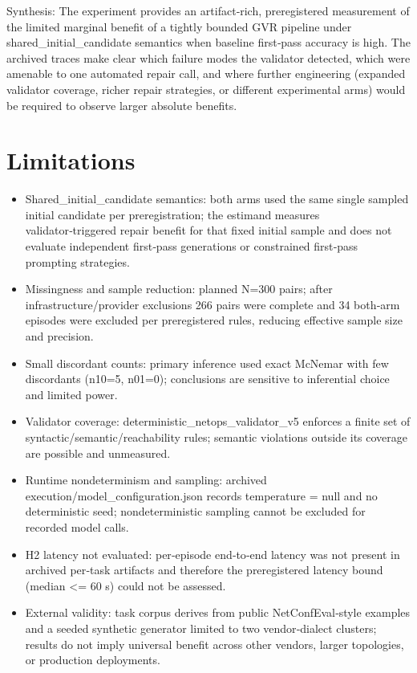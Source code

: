 \documentclass[conference]{IEEEtran}
\begin{document}
Synthesis: The experiment provides an artifact‑rich, preregistered measurement of the limited marginal benefit of a tightly bounded GVR pipeline under shared\_initial\_candidate semantics when baseline first‑pass accuracy is high. The archived traces make clear which failure modes the validator detected, which were amenable to one automated repair call, and where further engineering (expanded validator coverage, richer repair strategies, or different experimental arms) would be required to observe larger absolute benefits.

\section{Limitations}
\begin{itemize}
\item Shared\_initial\_candidate semantics: both arms used the same single sampled initial candidate per preregistration; the estimand measures validator‑triggered repair benefit for that fixed initial sample and does not evaluate independent first‑pass generations or constrained first‑pass prompting strategies.
\item Missingness and sample reduction: planned N=300 pairs; after infrastructure/provider exclusions 266 pairs were complete and 34 both‑arm episodes were excluded per preregistered rules, reducing effective sample size and precision.
\item Small discordant counts: primary inference used exact McNemar with few discordants (n10=5, n01=0); conclusions are sensitive to inferential choice and limited power.
\item Validator coverage: deterministic\_netops\_validator\_v5 enforces a finite set of syntactic/semantic/reachability rules; semantic violations outside its coverage are possible and unmeasured.
\item Runtime nondeterminism and sampling: archived execution/model\_configuration.json records temperature = null and no deterministic seed; nondeterministic sampling cannot be excluded for recorded model calls.
\item H2 latency not evaluated: per‑episode end‑to‑end latency was not present in archived per‑task artifacts and therefore the preregistered latency bound (median <= 60 s) could not be assessed.
\item External validity: task corpus derives from public NetConfEval‑style examples and a seeded synthetic generator limited to two vendor‑dialect clusters; results do not imply universal benefit across other vendors, larger topologies, or production deployments.
\end{itemize}
\end{document}

